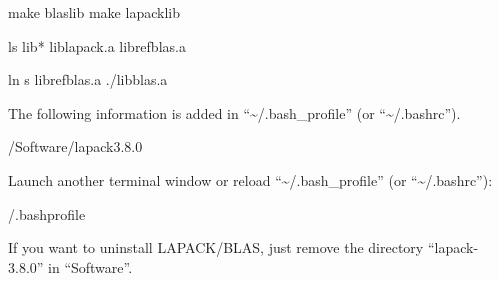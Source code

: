 \documentclass[a4paper,11pt,oneside,english]{sphinxmanual}
\begin{document}
\begin{sphinxVerbatim}[commandchars=\\\{\}]
\PYGZdl{} make blaslib
\PYGZdl{} make lapacklib

\PYGZdl{} ls lib*
liblapack.a  librefblas.a

\PYGZdl{} ln \PYGZhy{}s librefblas.a ./libblas.a
\end{sphinxVerbatim}

The following information is added in “\textasciitilde{}/.bash\_profile” (or “\textasciitilde{}/.bashrc”).

\begin{sphinxVerbatim}[commandchars=\\\{\}]
 /Software/lapack\PYGZhy{}3.8.0
\end{sphinxVerbatim}

Launch another terminal window or reload “\textasciitilde{}/.bash\_profile” (or “\textasciitilde{}/.bashrc”):

\begin{sphinxVerbatim}[commandchars=\\\{\}]
\PYGZdl{}  \PYGZti{}/.bash\PYGZus{}profile
\end{sphinxVerbatim}

If you want to uninstall LAPACK/BLAS, just remove the directory “lapack-3.8.0” in “Software”.
\label{\detokenize{99_References:zreferences}}
\end{document}
